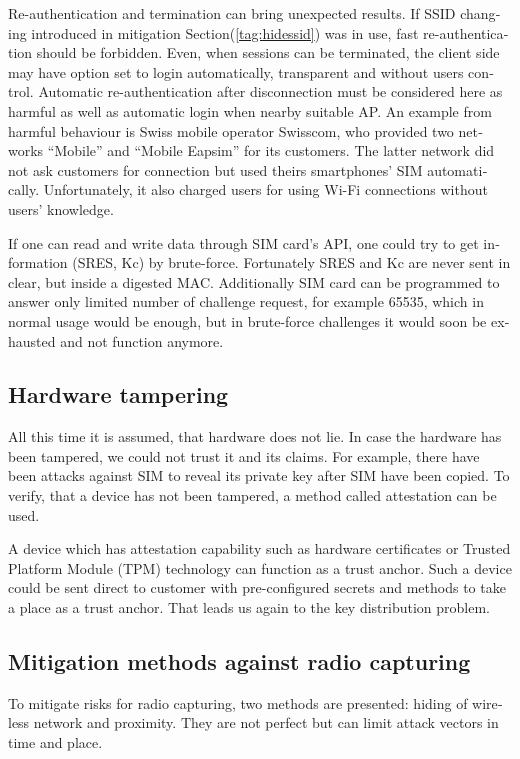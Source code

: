 \documentclass[12pt,a4paper,english]{tutthesis}
\begin{document}
\begin{otherlanguage}{english}
Re-authentication and termination can bring unexpected results.
If SSID changing introduced in mitigation Section(\ref{tag:hidessid}) was in use, fast re-authentication
should be forbidden\cite[p.11]{rfc5448}.
Even, when sessions can be terminated, the client side may have 
option set to login automatically, transparent and without users control.
Automatic re-authentication after disconnection  must be considered
here as harmful as well as automatic login when nearby suitable AP. An
example from harmful behaviour is Swiss mobile operator Swisscom, who
 provided two networks ``Mobile'' and ``Mobile Eapsim''  for its
customers. 
The latter network did not ask customers
for connection but used theirs smartphones' SIM automatically. Unfortunately,
it also charged users for using Wi-Fi connections without users'
knowledge.\cite{swisscom}



If one can read and write data through SIM card's API,
one could try to get information (SRES, Kc) by brute-force. 
Fortunately SRES and Kc are never sent in clear, but inside
a digested MAC.
 Additionally SIM card can be programmed to answer only
limited number of challenge request, for example 65535, which in
normal usage would be enough, but in brute-force challenges 
it would soon be exhausted and not function anymore.


\subsection{Hardware tampering}
\label{sec-6-4-6}
All this time it is assumed, that hardware does not lie. In case
the hardware has been tampered, we could not trust it and its claims.
For example, there have been attacks against SIM to reveal its private
key after SIM have been copied.  To verify, that a device has not been
tampered, a method called attestation can be used.

A device which has attestation capability such as 
hardware certificates or Trusted Platform Module (TPM) technology
can function as a trust anchor.
Such a device could be sent direct to customer with pre-configured
secrets and methods to take a place as a trust anchor. 
That leads us again to the key distribution problem.


\subsection{Mitigation methods against radio capturing}
\label{sec-6-4-7}
To mitigate risks for radio capturing, two methods are presented: hiding of
wireless network and proximity. They are not perfect but can
limit attack vectors in time and place.



\end{otherlanguage}
\end{document}
